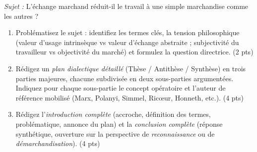 \documentclass[11pt]{article}
\begin{document}
\begin{exercice}
\emph{Sujet :} \og L'échange marchand réduit-il le travail à une simple marchandise comme les autres ? \fg
\begin{enumerate}
    \item Problématisez le sujet : identifiez les termes clés, la tension philosophique (valeur d'usage intrinsèque vs valeur d'échange abstraite ; subjectivité du travailleur vs objectivité du marché) et formulez la question directrice. \hfill (2 pts)
    \item Rédigez un \emph{plan dialectique détaillé} (Thèse / Antithèse / Synthèse) en trois parties majeures, chacune subdivisée en deux sous-parties argumentées. Indiquez pour chaque sous-partie le concept opératoire et l'auteur de référence mobilisé (Marx, Polanyi, Simmel, Ricœur, Honneth, etc.). \hfill (4 pts)
    \item Rédigez l'\emph{introduction complète} (accroche, définition des termes, problématique, annonce du plan) et la \emph{conclusion complète} (réponse synthétique, ouverture sur la perspective de \emph{reconnaissance} ou de \emph{démarchandisation}). \hfill (4 pts)
\end{enumerate}
\end{exercice}
\end{document}
